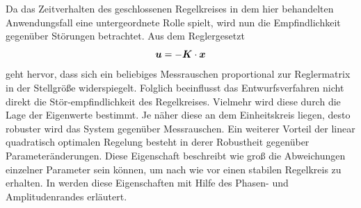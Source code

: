Da das Zeitverhalten des geschlossenen Regelkreises in dem hier behandelten Anwendungsfall eine untergeordnete Rolle spielt, wird nun die Empfindlichkeit gegenüber Störungen betrachtet. Aus dem Reglergesetzt
\begin{equation}
\boldsymbol{u} = -\boldsymbol{K}\cdot\boldsymbol{x}
\end{equation}
geht hervor, dass sich ein beliebiges Messrauschen proportional zur Reglermatrix in der Stellgröße widerspiegelt. Folglich beeinflusst das Entwurfsverfahren nicht direkt die Stör-empfindlichkeit des Regelkreises. Vielmehr wird diese durch die Lage der Eigenwerte bestimmt. Je näher diese an dem Einheitskreis liegen, desto robuster wird das System gegenüber Messrauschen.
Ein weiterer Vorteil der linear quadratisch optimalen Regelung besteht in derer Robustheit gegenüber Parameteränderungen. Diese Eigenschaft beschreibt wie groß die Abweichungen einzelner Parameter sein können, um nach wie vor einen stabilen Regelkreis zu erhalten. In \cite[S. 303 ff.]{LunzeRT2} werden diese Eigenschaften mit Hilfe des Phasen- und Amplitudenrandes erläutert.
